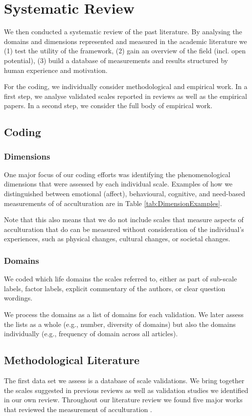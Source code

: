 \documentclass[man, 12pt, a4paper]{apa7}
\begin{document}
\section{Systematic Review}
We then conducted a systematic review of the past literature. By analysing the domains and dimensions represented and measured in the academic literature we (1) test the utility of the framework, (2) gain an overview of the field (incl. open potential), (3) build a database of measurements and results structured by human experience and motivation.

For the coding, we individually consider methodological and empirical work. In a first step, we analyse validated scales reported in reviews as well as the empirical papers. In a second step, we consider the full body of empirical work.

\subsection{Coding}
\subsubsection{Dimensions}
One major focus of our coding efforts was identifying the phenomenological dimensions that were assessed by each individual scale. Examples of how we distinguished between emotional (affect), behavioural, cognitive, and need-based measurements of of acculturation are in Table \ref{tab:DimensionExamples}.


Note that this also means that we do not include scales that measure aspects of acculturation that do can be measured without consideration of the individual’s experiences, such as physical changes, cultural changes, or societal changes.
\subsubsection{Domains}
We coded which life domains the scales referred to, either as part of sub-scale labels, factor labels, explicit commentary of the authors, or clear question wordings.

We process the domains as a list of domains for each validation. We later assess the lists as a whole (e.g., number, diversity of domains) but also the domains individually (e.g., frequency of domain across all articles).

\subsection{Methodological Literature}
The first data set we assess is a database of scale validations. We bring together the scales suggested in previous reviews as well as validation studies we identified in our own review. Throughout our literature review we found five major works that reviewed the measurement of acculturation \citep{Celenk2011, Maestas2000, Matsudaira2006, Wallace2010, Zane2004}.
\end{document}
